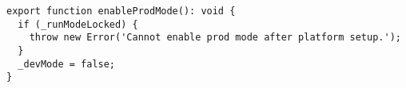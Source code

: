 \begin{verbatim}
export function enableProdMode(): void {
  if (_runModeLocked) {
    throw new Error('Cannot enable prod mode after platform setup.');
  }
  _devMode = false;
}
\end{verbatim}

